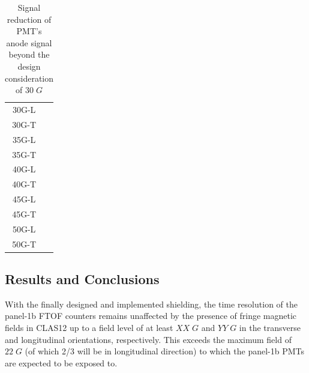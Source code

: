 \documentclass[12pt]{article}
\begin{document}
\begin{table}[H]
	\begin{center}
		\begin{tabular}{|c|c|}
			\hline
			30G-L &  \\
 			30G-T &  \\ 
 			\hline
 			35G-L &  \\
 			35G-T &  \\
 			\hline
 			40G-L &  \\
 			40G-T &  \\
 			\hline
 			45G-L & \\
 			45G-T &  \\
 			\hline
 			50G-L &  \\
 			50G-T &  \\
 			\hline
 		\end{tabular}
	\end{center}
	\caption{Signal reduction of PMT's anode signal beyond the design consideration of $30\;G$}
\end{table}


\subsection{Results and Conclusions}
With the finally designed and implemented shielding, the time resolution of the panel-1b FTOF counters remains unaffected by the presence of fringe magnetic fields in CLAS12 up to a field level of at least $XX\;G$ and $YY\;G$ in the transverse and longitudinal orientations, respectively. This exceeds the maximum field of $22\;G$ (of which 2/3 will be in longitudinal direction) to which the panel-1b PMTs are expected to be exposed to. 



\label{bib}


\end{document}

